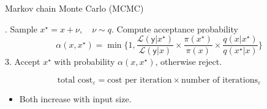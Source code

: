 \documentclass[aspectratio=169, 10pt, compress]{beamer}
\begin{document}
\begin{frame}{Markov chain Monte Carlo (MCMC)}
\begin{algorithm}[H]
\caption{Metropolis-Hastings \citep{Hastings1970}}
. Sample $x^{\star} = x + \nu, \quad \nu \sim q$. Compute acceptance probability 
\begin{equation*}
    \alpha(x, x^{\star}) = \min\{1, \frac{\mathcal{L}(\mathsf{y}|x^{\star})}{\mathcal{L}(\mathsf{y}|x)} \times \frac{\pi(x^{\star})}{\pi(x)} \times \frac{q(x|x^{\star})}{q(x^{\star}|x)}\}
\end{equation*}
3. Accept $x^{\star}$ with probability $\alpha(x, x^{\star})$, otherwise reject.\;
\end{algorithm}
\vspace{0.5cm}
\[
    \text{total cost}_{\varepsilon} = \text{cost per iteration} \times \text{number of iterations}_{\varepsilon}
\]
\begin{itemize}[<+->]
    \item Both increase with input size.

\end{itemize}
\end{frame}
\end{document}
